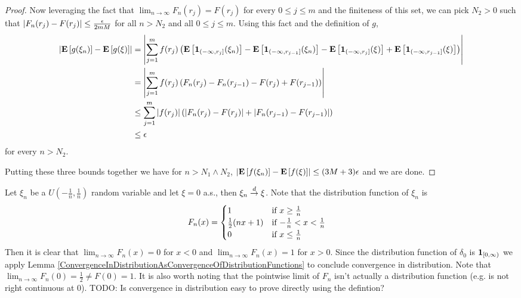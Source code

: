 \begin{proof}
Now leveraging the fact that $\lim_{n \to \infty} F_n(r_j) = F(r_j)$
for every $0 \leq j \leq m$ and the finiteness of this set, we can
pick $N_2 > 0$ such that $\left \vert F_n(r_j) - F(r_j) \right \vert \leq \frac{\epsilon}{2mM}$ for
all $n > N_2$ and all $0 \leq j \leq m$.  Using this fact and the
definition of $g$, 
\begin{align*}
\left \vert \textbf{E}\left[g(\xi_n)\right] - \textbf{E}\left[g(\xi)\right] \right \vert &= \left \vert \sum_{j=1}^m f(r_j) \left (\textbf{E}\left[\textbf{1}_{(-\infty,
    r_j]}(\xi_n)\right] - \textbf{E}\left[\textbf{1}_{(-\infty,
    r_{j-1}]}(\xi_n)\right] - \textbf{E}\left[\textbf{1}_{(-\infty,
    r_j]}(\xi)\right] + \textbf{E}\left[\textbf{1}_{(-\infty,
    r_{j-1}]}(\xi)\right]\right ) \right \vert \\
&=  \left \vert \sum_{j=1}^m f(r_j) \left (F_n(r_j) - F_n(r_{j-1}) - F(r_j)+
    F(r_{j-1}) \right ) \right \vert  \\
&\leq \sum_{j=1}^m \left \vert f(r_j) \right \vert \left( \left \vert F_n(r_j) - F(r_j) \right \vert +
  \left \vert F_n(r_{j-1}) - F(r_{j-1}) \right \vert \right )\\
&\leq \epsilon
\end{align*}
for every $n > N_2$.  

Putting these three bounds together we have for $n > N_1 \wedge N_2$,
$\left \vert \textbf{E}\left[f(\xi_n)\right] - \textbf{E}\left[f(\xi)\right] \right \vert \leq (3M + 3)
\epsilon$ and we are done.
\end{proof}

\begin{examp}Let $\xi_n$ be a $U(-\frac{1}{n}, \frac{1}{n})$ random
  variable and let $\xi = 0$ a.s., then $\xi_n \overset{d}\to \xi$.  Note
  that the distribution function of $\xi_n$ is 
\begin{align*}
F_n(x) &= \begin{cases}
1 & \text{if $x \geq \frac{1}{n}$} \\
\frac{1}{2}(nx + 1) & \text{if $-\frac{1}{n} < x < \frac{1}{n}$} \\
0 & \text{if $x \leq \-\frac{1}{n}$} \\
\end{cases}
\end{align*}
Then it is clear that $\lim_{n \to \infty} F_n(x) = 0$ for $x <
0$ and  $\lim_{n \to \infty} F_n(x) = 1$ for $x >
0$.   Since the distribution function of $\delta_0$ is
$\textbf{1}_{[0, \infty)}$ we apply Lemma
\ref{ConvergenceInDistributionAsConvergenceOfDistributionFunctions} to
conclude convergence in distribution.  Note that $\lim_{n \to \infty}
F_n(0) = \frac{1}{2} \neq F(0) = 1$.  It is also worth noting that the
pointwise limit of $F_n$ isn't actually a distribution function
(e.g. is not right continuous at $0$).
TODO: Is convergence in distribution easy to prove directly using the defintion?
\end{examp}

